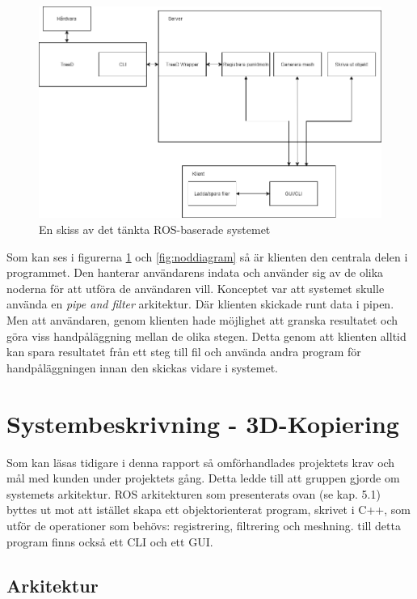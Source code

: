 \begin{figure}[H]
	\centering
	\includegraphics[width=130mm]{figures/Systemskiss_gamla.png}
	\caption{En skiss av det tänkta ROS-baserade systemet}
	\label{fig:systembeskrivning_gamla}
\end{figure}

Som kan ses i figurerna \ref{fig:systembeskrivning_gamla} och \ref{fig:noddiagram} så är klienten den centrala delen i programmet. Den hanterar användarens indata och använder sig av de olika noderna för att utföra de användaren vill. Konceptet var att systemet skulle använda en \textit{pipe and filter} arkitektur. Där klienten skickade runt data i pipen. Men att användaren, genom klienten hade möjlighet att granska resultatet och göra viss handpåläggning mellan de olika stegen. Detta genom att klienten alltid kan spara resultatet från ett steg till fil och använda andra program för handpåläggningen innan den skickas vidare i systemet.

\section{Systembeskrivning - 3D-Kopiering}

Som kan läsas tidigare i denna rapport så omförhandlades projektets krav och mål med kunden under projektets gång. Detta ledde till att gruppen gjorde om systemets arkitektur. ROS arkitekturen som presenterats ovan (se kap. 5.1) byttes ut mot att istället skapa ett objektorienterat program, skrivet i C++, som utför de operationer som behövs: registrering, filtrering och meshning. till detta program finns också ett CLI och ett GUI.

\subsection{Arkitektur}

